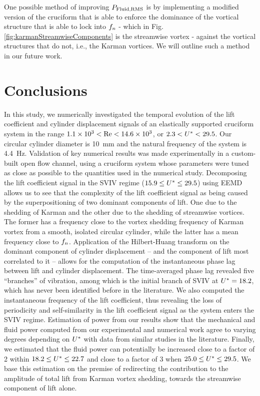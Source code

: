 \documentclass[a4paper,fleqn]{cas-sc}
\begin{document}
\color{blue}
One possible method of improving $P_{\text{Fluid,RMS}}$ is by implementing a modified version of the cruciform that is able to enforce the dominance of the vortical structure that is able to lock into $f_{n}$ - which in Fig. \ref{fig:karmanStreamwiseComponents} is the streamwise vortex - against the vortical structures that do not, i.e., the Karman vortices. We will outline such a method in our future work.
\color{black}

\section{Conclusions} \label{sec:conclusions}
In this study, we numerically investigated the temporal evolution of the lift coefficient and cylinder displacement signals of an elastically supported cruciform system in the range $1.1 \times 10^{3} < \text{Re} < 14.6 \times 10^{3}$, or $2.3 < U^{*} < 29.5$. Our circular cylinder diameter is \SI{10}{\milli\metre} and the natural frequency of the system is \SI{4.4}{\hertz}. Validation of key numerical results was made experimentally in a custom-built open flow channel, using a cruciform system whose parameters were tuned as close as possible to the quantities used in the numerical study. Decomposing the lift coefficient signal in the SVIV regime ($15.9 \leq U^{*} \leq 29.5$) using EEMD allows us to see that the complexity of the lift coefficient signal as being caused by the superpositioning of two dominant components of lift. One due to the shedding of Karman and the other due to the shedding of streamwise vortices. The former has a frequency close to the vortex shedding frequency of Karman vortex from a smooth, isolated circular cylinder, while the latter has a mean frequency close to $f_{n}$. Application of the Hilbert-Huang transform on the dominant component of cylinder displacement -- and the component of lift most correlated to it -- allows for the computation of the instantaneous phase lag between lift and cylinder displacement. The time-averaged phase lag revealed five ``branches'' of vibration, among which is the initial branch of SVIV at $U^{*} = 18.2$, which has never been identified before in the literature. We also computed the instantaneous frequency of the lift coefficient, thus revealing the loss of periodicity and self-similarity in the lift coefficient signal as the system enters the SVIV regime. Estimation of power from our results show that the \rms{} mechanical and fluid power computed from our experimental and numerical work agree to varying degrees depending on $U^{*}$ with data from similar studies in the literature. Finally, we estimated that the \rms{} fluid power can potentially be increased close to a factor of 2 within $18.2 \leq U^{*} \leq 22.7$ and close to a factor of 3 when $25.0 \leq U^{*} \leq 29.5$. We base this estimation on the premise of redirecting the contribution to the \rms{} amplitude of total lift from Karman vortex shedding, towards the streamwise component of lift alone.
\end{document}
